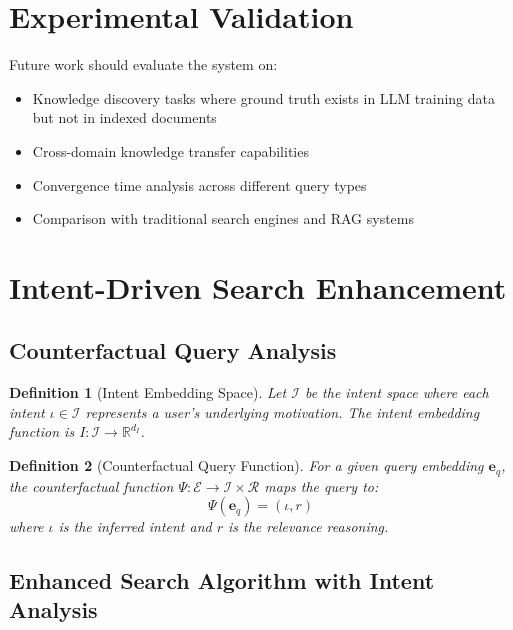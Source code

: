 \documentclass{article}
\newtheorem{definition}{Definition}
\begin{document}
\section{Experimental Validation}

Future work should evaluate the system on:
\begin{itemize}
\item Knowledge discovery tasks where ground truth exists in LLM training data but not in indexed documents
\item Cross-domain knowledge transfer capabilities
\item Convergence time analysis across different query types
\item Comparison with traditional search engines and RAG systems
\end{itemize}

\section{Intent-Driven Search Enhancement}

\subsection{Counterfactual Query Analysis}

\begin{definition}[Intent Embedding Space]
Let $\mathcal{I}$ be the intent space where each intent $\iota \in \mathcal{I}$ represents a user's underlying motivation. The intent embedding function is $I: \mathcal{I} \rightarrow \mathbb{R}^{d_I}$.
\end{definition}

\begin{definition}[Counterfactual Query Function]
For a given query embedding $\mathbf{e}_q$, the counterfactual function $\Psi: \mathcal{E} \rightarrow \mathcal{I} \times \mathcal{R}$ maps the query to:
$$\Psi(\mathbf{e}_q) = (\iota, r)$$
where $\iota$ is the inferred intent and $r$ is the relevance reasoning.
\end{definition}

\subsection{Enhanced Search Algorithm with Intent Analysis}
\end{document}
